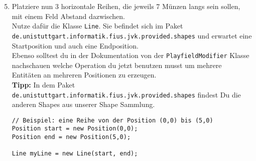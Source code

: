 \begin{enumerate}
	\setcounter{enumi}{4}
    \item Platziere nun 3 horizontale Reihen, die jeweils 7 Münzen langs sein sollen, mit einem Feld Abstand dazwischen.\\
	Nutze dafür die Klasse \lstinline{Line}. Sie befindet sich im Paket\\\texttt{de.unistuttgart.informatik.fius.jvk.provided.shapes} und erwartet eine Startposition und auch eine Endposition.\\
    Ebenso solltest du in der Dokumentation von der \lstinline{PlayfieldModifier} Klasse nachschauen welche Operation du jetzt benutzen musst um mehrere Entitäten an mehreren Positionen zu erzeugen.\\
	\textbf{Tipp:} In dem Paket \texttt{de.unistuttgart.informatik.fius.jvk.provided.shapes} findest Du die anderen Shapes aus unserer Shape Sammlung.

    \begin{lstlisting}
// Beispiel: eine Reihe von der Position (0,0) bis (5,0)
Position start = new Position(0,0);
Position end = new Position(5,0);

Line myLine = new Line(start, end);
    \end{lstlisting}

\end{enumerate}
